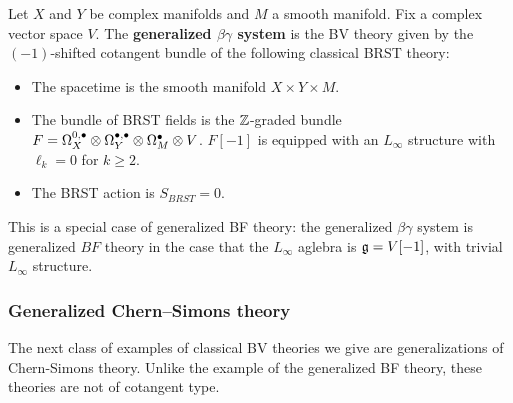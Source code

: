 \documentclass[10pt, oneside]{article}
\begin{document}
\begin{definition}
Let $X$ and $Y$ be complex manifolds and $M$ a smooth manifold. Fix a complex vector space $V$. The {\bf generalized $\beta\gamma$ system} is the BV theory given by the $(-1)$-shifted cotangent bundle of the following classical BRST theory:
\begin{itemize}
\item The spacetime is the smooth manifold $X\times Y\times M$.

\item The bundle of BRST fields is the $\mathbb Z$-graded bundle $F = \Omega^{0,\bullet}_X \otimes \Omega^{\bullet,\bullet}_Y \otimes \Omega^\bullet_M \otimes V$. $F[-1]$ is equipped with an $L_\infty$ structure with $\ell_{k} = 0$ for $k \geq 2$. 

\item The BRST action is $S_{BRST} = 0$.
\end{itemize}
\end{definition}

\begin{rmk}
This is a special case of generalized BF theory:
the generalized $\beta\gamma$ system is generalized $BF$ theory in the case that the $L_\infty$ aglebra is $\mathfrak g = V[-1]$, with trivial $L_\infty$ structure. 
\end{rmk}



\subsubsection{Generalized Chern--Simons theory} \label{gen_CS_section}

The next class of examples of classical BV theories we give are generalizations of Chern-Simons theory. Unlike the example of the generalized BF theory, these theories are not of cotangent type.
\end{document}
